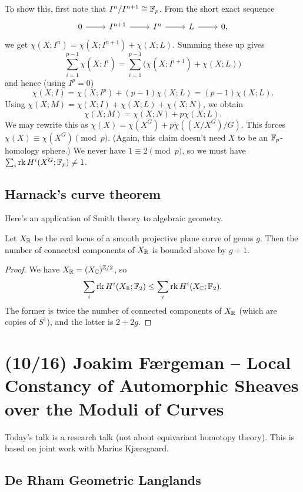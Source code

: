 \documentclass{article}
\begin{document}
To show this, first note that $I^n / I^{n+1} \cong \mathbb{F}_p$.
From the short exact sequence
\[
  \begin{tikzcd}
    0 \rar & I^{n+1} \rar & I^n \rar & L \rar & 0,
  \end{tikzcd}
\]
we get $\chi(X; I^n) = \chi(X; I^{n+1}) + \chi(X; L)$.
Summing these up gives
\[
  \sum_{i=1}^{p-1} \chi(X; I^i) = \sum_{i=1}^{p-1} \big(\chi(X; I^{i+1}) + \chi(X; L)\big)
\]
and hence (using $I^p = 0$)
\[
  \chi(X; I) = \chi(X; I^p) + (p - 1) \chi(X; L) = (p - 1) \chi(X; L).
\]
Using $\chi(X; M) = \chi(X; I) + \chi(X; L) + \chi(X; N)$, we obtain
\[
  \chi(X; M) = \chi(X; N) + p \chi(X; L).
\]
We may rewrite this as $\chi(X) = \chi(X^G) + p \tilde{\chi}((X / X^G) / G)$.
This forces $\chi(X) \equiv \chi(X^G) \pmod p$.
(Again, this claim doesn't need $X$ to be an $\mathbb{F}_p$-homology sphere.)
We never have $1 \equiv 2 \pmod p$, so we must have $\sum_i \operatorname{rk} H^i(X^G; \mathbb{F}_p) \neq 1$.

\subsection{Harnack's curve theorem}

Here's an application of Smith theory to algebraic geometry.

\begin{thm}[Harnack]
  Let $X_{\mathbb{R}}$ be the real locus of a smooth projective plane curve of genus $g$.
  Then the number of connected components of $X_{\mathbb{R}}$ is bounded above by $g + 1$.
\end{thm}

\begin{proof}
  We have $X_{\mathbb{R}} = (X_{\mathbb{C}})^{\mathbb{Z}/2}$, so
  \[
    \sum_i \operatorname{rk} H^i(X_{\mathbb{R}}; \mathbb{F}_2) \leq \sum_i \operatorname{rk} H^i(X_{\mathbb{C}}; \mathbb{F}_2).
  \]
  The former is twice the number of connected components of $X_{\mathbb{R}}$ (which are copies of $S^1$), and the latter is $2 + 2g$.
\end{proof}

\section{(10/16) Joakim F{\ae}rgeman -- Local Constancy of Automorphic Sheaves over the Moduli of Curves}

Today's talk is a research talk (not about equivariant homotopy theory).
This is based on joint work with Marius Kj{\ae}rsgaard.

\subsection{De Rham Geometric Langlands}
\end{document}

